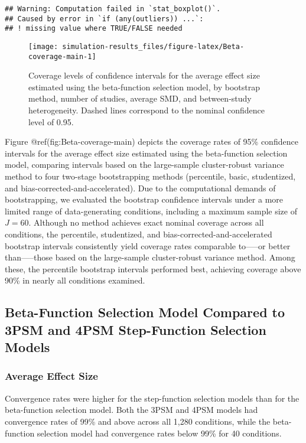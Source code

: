 \documentclass[
]{article}
\begin{document}
\begin{verbatim}
## Warning: Computation failed in `stat_boxplot()`.
## Caused by error in `if (any(outliers)) ...`:
## ! missing value where TRUE/FALSE needed
\end{verbatim}

\begin{sidewaysfigure}
\texttt{[image: simulation-results\_files/figure-latex/Beta-coverage-main-1]} \caption{Coverage levels of confidence intervals for the average effect size estimated using the beta-function selection model, by bootstrap method, number of studies, average SMD, and between-study heterogeneity. Dashed lines correspond to the nominal confidence level of 0.95.}\label{fig:Beta-coverage-main}
\end{sidewaysfigure}

Figure @ref(fig:Beta-coverage-main) depicts the coverage rates of 95\%
confidence intervals for the average effect size estimated using the
beta-function selection model, comparing intervals based on the
large-sample cluster-robust variance method to four two-stage
bootstrapping methods (percentile, basic, studentized, and
bias-corrected-and-accelerated). Due to the computational demands of
bootstrapping, we evaluated the bootstrap confidence intervals under a
more limited range of data-generating conditions, including a maximum
sample size of \(J = 60\). Although no method achieves exact nominal
coverage across all conditions, the percentile, studentized, and
bias-corrected-and-accelerated bootstrap intervals consistently yield
coverage rates comparable to-----or better than-----those based on the
large-sample cluster-robust variance method. Among these, the percentile
bootstrap intervals performed best, achieving coverage above 90\% in
nearly all conditions examined.

\subsection{Beta-Function Selection Model Compared to 3PSM and 4PSM
Step-Function Selection
Models}\label{beta-function-selection-model-compared-to-3psm-and-4psm-step-function-selection-models}

\subsubsection{Average Effect Size}\label{average-effect-size-1}

Convergence rates were higher for the step-function selection models
than for the beta-function selection model. Both the 3PSM and 4PSM
models had convergence rates of 99\% and above across all 1,280
conditions, while the beta-function selection model had convergence
rates below 99\% for 40 conditions.
\end{document}
